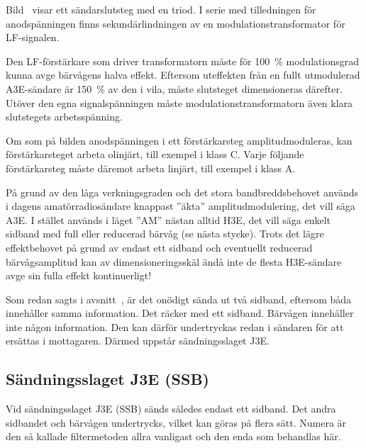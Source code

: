 
Bild~ visar ett sändarslutsteg med en triod.
I serie med tilledningen för anodspänningen finns sekundärlindningen av en
modulationstransformator för LF-signalen.

Den LF-förstärkare som driver transformatorn måste för 100~\% modulationsgrad
kunna avge bärvågens halva effekt.
Eftersom uteffekten från en fullt utmodulerad A3E-sändare är 150~\% av den i
vila, måste slutsteget dimensioneras därefter.
Utöver den egna signalspänningen måste modulationstransformatorn även klara
slutstegets arbetsspänning.

Om som på bilden anodspänningen i ett förstärkarsteg amplitudmoduleras,
kan förstärkarsteget arbeta olinjärt, till exempel i klass C.
Varje följande förstärkarsteg måste däremot arbeta linjärt, till exempel i klass A.

På grund av den låga verkningsgraden och det stora bandbreddsbehovet används i
dagens amatörradiosändare knappast ''äkta'' amplitudmodulering,
det vill säga A3E.
I stället används i läget ''AM'' nästan alltid H3E, det vill säga enkelt
sidband med full eller reducerad bärvåg (se nästa stycke).
Trots det lägre effektbehovet på grund av endast ett sidband och eventuellt
reducerad bärvågsamplitud kan av dimensioneringsskäl ändå inte de flesta
H3E-sändare avge sin fulla effekt kontinuerligt!

Som redan sagts i avsnitt~, är det onödigt sända ut två
sidband, eftersom båda innehåller samma information.
Det räcker med ett sidband.
Bärvågen innehåller inte någon information.
Den kan därför undertryckas redan i sändaren för att ersättas i mottagaren.
Därmed uppstår sändningsslaget J3E.

\newpage
\subsection{Sändningsslaget J3E (SSB)}

Vid sändningsslaget J3E (SSB) sänds således endast ett sidband.
Det andra sidbandet och bärvågen undertrycks, vilket kan göras på flera sätt.
Numera är den så kallade filtermetoden allra vanligast och den enda som
behandlas här.


